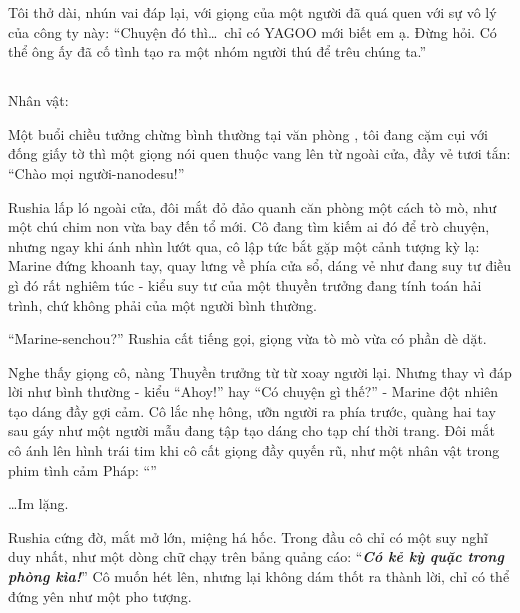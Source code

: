 \documentclass[../main.tex]{subfiles}
\begin{document}
Tôi thở dài, nhún vai đáp lại, với giọng của một người đã quá quen với sự vô lý của công ty này: ``Chuyện đó thì\dots\ chỉ có YAGOO mới biết em ạ. Đừng hỏi. Có thể ông ấy đã cố tình tạo ra một nhóm người thú để trêu chúng ta.''

\newpage

\subsection*{\label{ep-S16.III}}
\vspace{-4pt}
\begin{center}
    {\caviar\fontsize{12pt}{12pt}\selectfont Nhân vật:   }
\end{center}

Một buổi chiều tưởng chừng bình thường tại văn phòng \hll, tôi đang cặm cụi với đống giấy tờ thì một giọng nói quen thuộc vang lên từ ngoài cửa, đầy vẻ tươi tắn: ``Chào mọi người-nanodesu!''

Rushia lấp ló ngoài cửa, đôi mắt đỏ đảo quanh căn phòng một cách tò mò, như một chú chim non vừa bay đến tổ mới. Cô đang tìm kiếm ai đó để trò chuyện, nhưng ngay khi ánh nhìn lướt qua, cô lập tức bắt gặp một cảnh tượng kỳ lạ: Marine đứng khoanh tay, quay lưng về phía cửa sổ, dáng vẻ như đang suy tư điều gì đó rất nghiêm túc - kiểu suy tư của một thuyền trưởng đang tính toán hải trình, chứ không phải của một người bình thường.

``Marine-senchou?'' Rushia cất tiếng gọi, giọng vừa tò mò vừa có phần dè dặt.

Nghe thấy giọng cô, nàng Thuyền trưởng từ từ xoay người lại. Nhưng thay vì đáp lời như bình thường - kiểu ``Ahoy!'' hay ``Có chuyện gì thế?'' - Marine đột nhiên tạo dáng đầy gợi cảm. Cô lắc nhẹ hông, ưỡn người ra phía trước, quàng hai tay sau gáy như một người mẫu đang tập tạo dáng cho tạp chí thời trang. Đôi mắt cô ánh lên hình trái tim khi cô cất giọng đầy quyến rũ, như một nhân vật trong phim tình cảm Pháp: ``''


\dots Im lặng.

Rushia cứng đờ, mắt mở lớn, miệng há hốc. Trong đầu cô chỉ có một suy nghĩ duy nhất, như một dòng chữ chạy trên bảng quảng cáo: ``\textbf{\textit{Có kẻ kỳ quặc trong phòng kìa!}}'' Cô muốn hét lên, nhưng lại không dám thốt ra thành lời, chỉ có thể đứng yên như một pho tượng.
\end{document}

